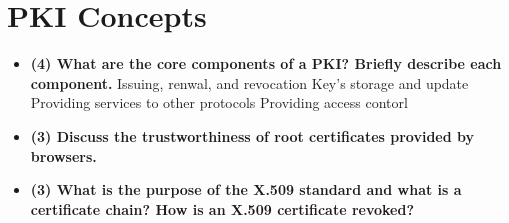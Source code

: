 \documentclass[letterpaper,11pt,notitlepage,fleqn]{article}
\begin{document}
\section{PKI Concepts}
\begin{itemize}
    \item \textbf{(4)  What  are  the  core  components  of  a  PKI?  Briefly  describe  each component.}
        \subitem Issuing, renwal, and revocation
        \subitem Key's storage and update
        \subitem Providing services to other protocols
        \subitem Providing access contorl
    \item \textbf{(3) Discuss the trustworthiness of root certificates provided by browsers.}

    \item \textbf{(3)  What  is  the  purpose  of  the  X.509  standard  and  what  is  a  certificate chain? How is an X.509 certificate revoked?}
\end{itemize}


\medskip


\end{document}
